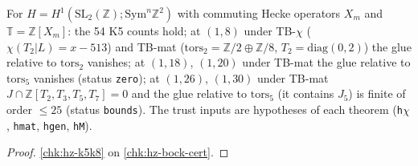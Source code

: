 \begin{theorem}\label{chk:hz-bock-cells}
  \leanok
  For $H=H^1(\mathrm{SL}_2(\mathbb Z);\mathrm{Sym}^n\mathbb Z^2)$ with commuting Hecke operators $X_m$ and $\mathbb T=\mathbb Z[X_m]$: the 54 K5 counts hold;
  at $(1,8)$ under TB-$\chi$ ($\chi(T_2|L)=x-513$) and TB-mat ($\mathrm{tors}_2=\mathbb Z/2\oplus\mathbb Z/8$, $T_2=\mathrm{diag}(0,2)$) the glue relative to
  $\mathrm{tors}_2$ vanishes; at $(1,18)$, $(1,20)$ under TB-mat the glue relative to $\mathrm{tors}_5$ vanishes (status \texttt{zero}); at $(1,26)$, $(1,30)$
  under TB-mat $J\cap\mathbb Z[T_2,T_3,T_5,T_7]=0$ and the glue relative to $\mathrm{tors}_5$ (it contains $J_5$) is finite of order $\le25$ (status \texttt{bounds}). The trust inputs are hypotheses of each
  theorem (\texttt{h$\chi$}, \texttt{hmat}, \texttt{hgen}, \texttt{hM}).
\end{theorem}
\begin{proof}
  \leanok
  \ref{chk:hz-k5k8} on \ref{chk:hz-bock-cert}.
\end{proof}

